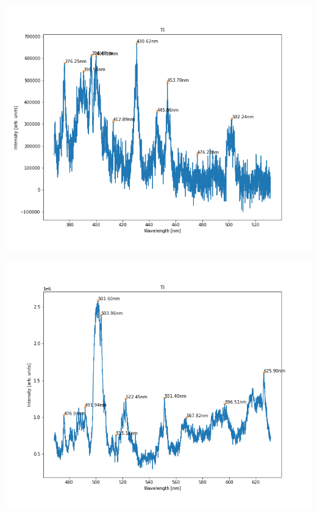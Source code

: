 \documentclass{beamer}
\begin{document}
\begin{frame}
    \includegraphics[scale=0.45]{Ti/Ti_450.png}
\end{frame}

\begin{frame}
    \includegraphics[scale=0.45]{Ti/Ti_550.png}
\end{frame}
\end{document}
